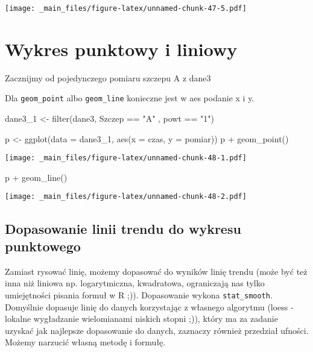 \documentclass[
]{book}
\newenvironment{Shaded}{\begin{snugshade}}{\end{snugshade}}
\newcommand{\AttributeTok}[1]{\textcolor[rgb]{0.77,0.63,0.00}{#1}}
\newcommand{\FunctionTok}[1]{\textcolor[rgb]{0.00,0.00,0.00}{#1}}
\newcommand{\NormalTok}[1]{#1}
\newcommand{\OtherTok}[1]{\textcolor[rgb]{0.56,0.35,0.01}{#1}}
\newcommand{\SpecialCharTok}[1]{\textcolor[rgb]{0.00,0.00,0.00}{#1}}
\newcommand{\StringTok}[1]{\textcolor[rgb]{0.31,0.60,0.02}{#1}}
\begin{document}
\texttt{[image: \_main\_files/figure-latex/unnamed-chunk-47-5.pdf]}

\hypertarget{wykres-punktowy-i-liniowy}{%
\section{Wykres punktowy i liniowy}\label{wykres-punktowy-i-liniowy}}

Zacznijmy od pojedynczego pomiaru szczepu A z dane3

Dla \texttt{geom\_point} albo \texttt{geom\_line} konieczne jest w aes podanie x i y.

\begin{Shaded}
\begin{Highlighting}[]
\NormalTok{dane3\_1 }\OtherTok{\textless{}{-}} \FunctionTok{filter}\NormalTok{(dane3, Szczep }\SpecialCharTok{==} \StringTok{"A"}\NormalTok{ , powt }\SpecialCharTok{==} \StringTok{"1"}\NormalTok{)}

\NormalTok{p }\OtherTok{\textless{}{-}} \FunctionTok{ggplot}\NormalTok{(}\AttributeTok{data =}\NormalTok{ dane3\_1, }\FunctionTok{aes}\NormalTok{(}\AttributeTok{x =}\NormalTok{ czas, }\AttributeTok{y =}\NormalTok{ pomiar))}
\NormalTok{p }\SpecialCharTok{+} \FunctionTok{geom\_point}\NormalTok{()}
\end{Highlighting}
\end{Shaded}

\texttt{[image: \_main\_files/figure-latex/unnamed-chunk-48-1.pdf]}

\begin{Shaded}
\begin{Highlighting}[]
\NormalTok{p }\SpecialCharTok{+} \FunctionTok{geom\_line}\NormalTok{()}
\end{Highlighting}
\end{Shaded}

\texttt{[image: \_main\_files/figure-latex/unnamed-chunk-48-2.pdf]}

\hypertarget{dopasowanie-linii-trendu-do-wykresu-punktowego}{%
\subsection{Dopasowanie linii trendu do wykresu punktowego}\label{dopasowanie-linii-trendu-do-wykresu-punktowego}}

Zamiast rysować linię, możemy dopasować do wyników linię trendu (może być też inna niż liniowa np. logarytmiczna, kwadratowa, ograniczają nas tylko umiejętności pisania formuł w R ;)). Dopasowanie wykona \texttt{stat\_smooth}. Domyślnie dopasuje linię do danych korzystając z własnego algorytmu (loess - lokalne wygładzanie wielomianami niskich stopni ;)), który ma za zadanie uzyskać jak najlepsze dopasowanie do danych, zaznaczy również przedział ufności. Możemy narzucić własną metodę i formułę.
\end{document}
